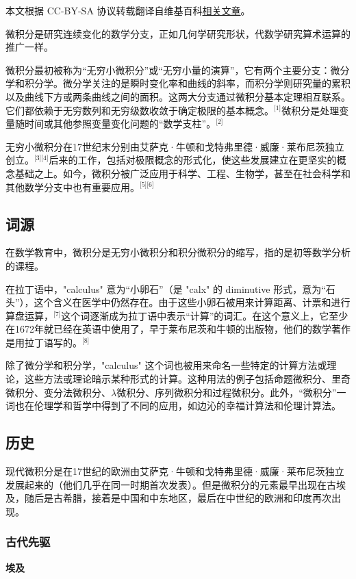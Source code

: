 
本文根据 CC-BY-SA 协议转载翻译自维基百科\href{https://en.wikipedia.org/wiki/Calculus}{相关文章}。

微积分是研究连续变化的数学分支，正如几何学研究形状，代数学研究算术运算的推广一样。

微积分最初被称为“无穷小微积分”或“无穷小量的演算”，它有两个主要分支：微分学和积分学。微分学关注的是瞬时变化率和曲线的斜率，而积分学则研究量的累积以及曲线下方或两条曲线之间的面积。这两大分支通过微积分基本定理相互联系。它们都依赖于无穷数列和无穷级数收敛于确定极限的基本概念。\(^\text{[1]}\)微积分是处理变量随时间或其他参照变量变化问题的“数学支柱”。\(^\text{[2]}\)

无穷小微积分在17世纪末分别由艾萨克·牛顿和戈特弗里德·威廉·莱布尼茨独立创立。\(^\text{[3][4]}\)后来的工作，包括对极限概念的形式化，使这些发展建立在更坚实的概念基础之上。如今，微积分被广泛应用于科学、工程、生物学，甚至在社会科学和其他数学分支中也有重要应用。\(^\text{[5][6]}\)
\subsection{词源}
在数学教育中，微积分是无穷小微积分和积分微积分的缩写，指的是初等数学分析的课程。

在拉丁语中，"calculus" 意为“小卵石”（是 "calx" 的 diminutive 形式，意为“石头”），这个含义在医学中仍然存在。由于这些小卵石被用来计算距离、计票和进行算盘运算，\(^\text{[7]}\)这个词逐渐成为拉丁语中表示“计算”的词汇。在这个意义上，它至少在1672年就已经在英语中使用了，早于莱布尼茨和牛顿的出版物，他们的数学著作是用拉丁语写的。\(^\text{[8]}\)

除了微分学和积分学，"calculus" 这个词也被用来命名一些特定的计算方法或理论，这些方法或理论暗示某种形式的计算。这种用法的例子包括命题微积分、里奇微积分、变分法微积分、\(\lambda\)微积分、序列微积分和过程微积分。此外，“微积分”一词也在伦理学和哲学中得到了不同的应用，如边沁的幸福计算法和伦理计算法。
\subsection{历史}  
现代微积分是在17世纪的欧洲由艾萨克·牛顿和戈特弗里德·威廉·莱布尼茨独立发展起来的（他们几乎在同一时期首次发表）。但是微积分的元素最早出现在古埃及，随后是古希腊，接着是中国和中东地区，最后在中世纪的欧洲和印度再次出现。
\subsubsection{古代先驱}
\textbf{埃及}  

